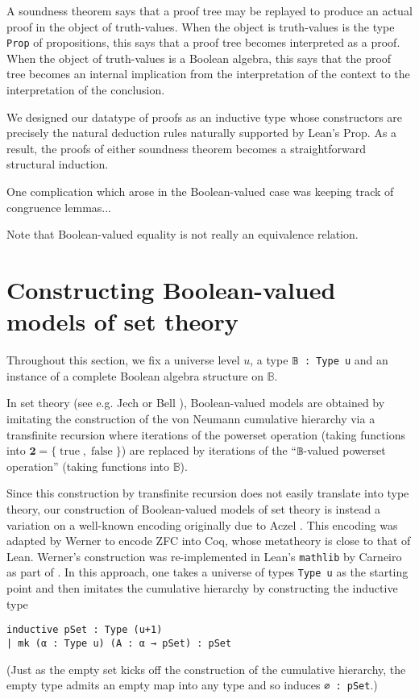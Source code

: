 \documentclass[a4paper,USenglish,cleveref, autoref]{lipics-v2019}
\newcommand{\B}{\mathbb{B}}
\begin{document}
A soundness theorem says that a proof tree may be replayed to produce an actual proof in the object of truth-values. When the object is truth-values is the type \texttt{Prop} of propositions, this says that a proof tree becomes interpreted as a proof. When the object of truth-values is a Boolean algebra, this says that the proof tree becomes an internal implication from the interpretation of the context to the interpretation of the conclusion.

We designed our datatype of proofs as an inductive type whose constructors are precisely the natural deduction rules naturally supported by Lean's Prop. As a result, the proofs of either soundness theorem becomes a straightforward structural induction.

One complication which arose in the Boolean-valued case was keeping track of congruence lemmas...

Note that Boolean-valued equality is not really an equivalence relation.
\section{Constructing Boolean-valued models of set theory}
\label{sect:bvm}
Throughout this section, we fix a universe level $u$, a type \lstinline{𝔹 : Type u} and an instance of a complete Boolean algebra structure on $\B$.

In set theory (see e.g. Jech \cite{jech1} or Bell \cite{bell1}), Boolean-valued models are obtained by imitating the construction of the von Neumann cumulative hierarchy via a transfinite recursion where iterations of the powerset operation (taking functions into $\mathbf{2} = \{\operatorname{true}, \operatorname{false}\}$) are replaced by iterations of the ``\lstinline{𝔹}-valued powerset operation'' (taking functions into $\B$).

Since this construction by transfinite recursion does not easily translate into type theory, our construction of Boolean-valued models of set theory is instead a variation on a well-known encoding originally due to Aczel \cite{aczel1} \cite{aczel2} \cite{aczel3}. This encoding was adapted by Werner \cite{werner1} to encode ZFC into Coq, whose metatheory is close to that of Lean. Werner's construction was re-implemented in Lean's \texttt{mathlib} by Carneiro as part of \cite{mario1}. In this approach, one takes a universe of types \texttt{Type u} as the starting point and then imitates the cumulative hierarchy by constructing the inductive type
\begin{lstlisting}
inductive pSet : Type (u+1)
| mk (α : Type u) (A : α → pSet) : pSet
\end{lstlisting}
(Just as the empty set kicks off the construction of the cumulative hierarchy, the empty type admits an empty map into any type and so induces \lstinline{∅ : pSet}.)
\end{document}
